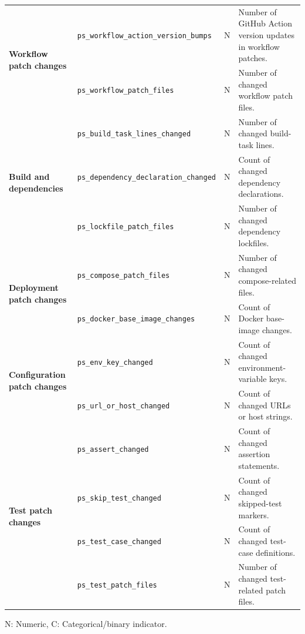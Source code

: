 \documentclass[conference]{IEEEconf}
\begin{document}
\begin{table}[!tp]
\begin{tabular}{p{2.6cm}p{5.3cm}p{0.8cm}p{7.2cm}}
\multirow{2}{*}{\textbf{Workflow patch changes}}
& \texttt{ps\_workflow\_action\_version\_bumps} & N & Number of GitHub Action version updates in workflow patches. \\
& \texttt{ps\_workflow\_patch\_files} & N & Number of changed workflow patch files. \\
\midrule

\multirow{3}{*}{\textbf{Build and dependencies}}
& \texttt{ps\_build\_task\_lines\_changed} & N & Number of changed build-task lines. \\
& \texttt{ps\_dependency\_declaration\_changed} & N & Count of changed dependency declarations. \\
& \texttt{ps\_lockfile\_patch\_files} & N & Number of changed dependency lockfiles. \\
\midrule

\multirow{2}{*}{\textbf{Deployment patch changes}}
& \texttt{ps\_compose\_patch\_files} & N & Number of changed compose-related files. \\
& \texttt{ps\_docker\_base\_image\_changes} & N & Count of Docker base-image changes. \\
\midrule

\multirow{2}{*}{\textbf{Configuration patch changes}}
& \texttt{ps\_env\_key\_changed} & N & Count of changed environment-variable keys. \\
& \texttt{ps\_url\_or\_host\_changed} & N & Count of changed URLs or host strings. \\
\midrule

\multirow{4}{*}{\textbf{Test patch changes}}
& \texttt{ps\_assert\_changed} & N & Count of changed assertion statements. \\
& \texttt{ps\_skip\_test\_changed} & N & Count of changed skipped-test markers. \\
& \texttt{ps\_test\_case\_changed} & N & Count of changed test-case definitions. \\
& \texttt{ps\_test\_patch\_files} & N & Number of changed test-related patch files. \\
\bottomrule
\end{tabular}

\vspace{2mm}
\raggedright\footnotesize{N: Numeric, C: Categorical/binary indicator.}
\end{table}
\end{document}
